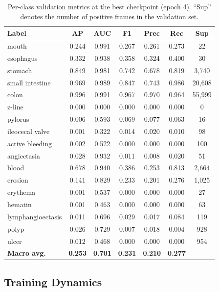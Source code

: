 \documentclass[12pt]{article}
\begin{document}
\begin{table}[htbp]
\centering
\caption{Per-class validation metrics at the best checkpoint (epoch 4). ``Sup'' denotes the number of positive frames in the validation set.}
\label{tab:val_perclass}
\begin{tabular}{lcccccc}
\toprule
\textbf{Label} & \textbf{AP} & \textbf{AUC} & \textbf{F1} & \textbf{Prec} & \textbf{Rec} & \textbf{Sup} \\
\midrule
mouth & 0.244 & 0.991 & 0.267 & 0.261 & 0.273 & 22 \\
esophagus & 0.332 & 0.938 & 0.358 & 0.324 & 0.400 & 30 \\
stomach & 0.849 & 0.981 & 0.742 & 0.678 & 0.819 & 3,740 \\
small intestine & 0.969 & 0.989 & 0.847 & 0.743 & 0.986 & 20,608 \\
colon & 0.996 & 0.991 & 0.967 & 0.970 & 0.964 & 55,999 \\
z-line & 0.000 & 0.000 & 0.000 & 0.000 & 0.000 & 0 \\
pylorus & 0.006 & 0.593 & 0.069 & 0.077 & 0.063 & 16 \\
ileocecal valve & 0.001 & 0.322 & 0.014 & 0.020 & 0.010 & 98 \\
active bleeding & 0.002 & 0.522 & 0.000 & 0.000 & 0.000 & 100 \\
angiectasia & 0.028 & 0.932 & 0.011 & 0.008 & 0.020 & 51 \\
blood & 0.678 & 0.940 & 0.386 & 0.253 & 0.813 & 2,664 \\
erosion & 0.141 & 0.829 & 0.233 & 0.201 & 0.276 & 1,025 \\
erythema & 0.001 & 0.537 & 0.000 & 0.000 & 0.000 & 27 \\
hematin & 0.001 & 0.463 & 0.000 & 0.000 & 0.000 & 63 \\
lymphangioectasis & 0.011 & 0.696 & 0.029 & 0.017 & 0.084 & 119 \\
polyp & 0.026 & 0.729 & 0.007 & 0.018 & 0.004 & 928 \\
ulcer & 0.012 & 0.468 & 0.000 & 0.000 & 0.000 & 954 \\
\midrule
\textbf{Macro avg.} & \textbf{0.253} & \textbf{0.701} & \textbf{0.231} & \textbf{0.210} & \textbf{0.277} & --- \\
\bottomrule
\end{tabular}
\end{table}

\subsection{Training Dynamics}
\end{document}
